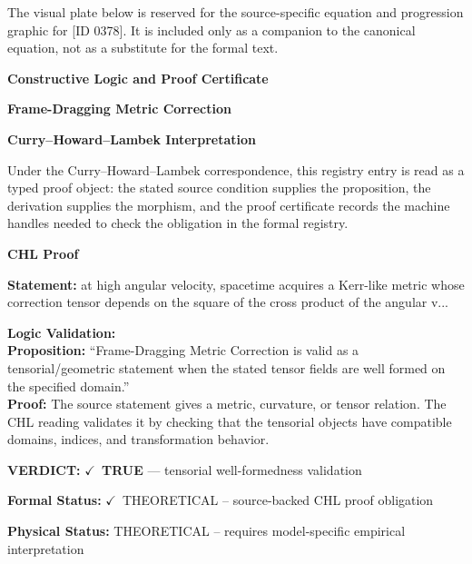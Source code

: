 \begingroup\footnotesize\sloppy
The visual plate below is reserved for the source-specific equation and progression graphic for [ID 0378]. It is included only as a companion to the canonical equation, not as a substitute for the formal text.
\par\endgroup
\ifTZPDarkEdition
{}
\fi

\clearpage
\begingroup\tzpsupportsetup
\noindent\textbf{\fontsize{10.8pt}{12.8pt}\selectfont [ID 0378] Constructive Logic and Proof Certificate}\par
\noindent\textbf{\fontsize{10pt}{12pt}\selectfont Frame-Dragging Metric Correction}\par
\vspace{0.45em}
\begingroup
\footnotesize
\setlength{\parskip}{0.22em}
\setlength{\parindent}{0pt}
\noindent\textbf{Curry--Howard--Lambek Interpretation}\par
Under the Curry--Howard--Lambek correspondence, this registry entry is read as a typed proof
object: the stated source condition supplies the proposition, the derivation supplies the
morphism, and the proof certificate records the machine handles needed to check the obligation
in the formal registry.

\vspace{0.45em}
\noindent\textbf{CHL Proof}\par
\textbf{Statement:} at high angular velocity, spacetime acquires a Kerr-like metric whose correction tensor
depends on the square of the cross product of the angular v...

\textbf{Logic Validation:}\\
\textbf{Proposition:} ``Frame-Dragging Metric Correction is valid as a tensorial/geometric statement when the
stated tensor fields are well formed on the specified domain.''\\
\textbf{Proof:} The source statement gives a metric, curvature, or tensor relation. The CHL reading
validates it by checking that the tensorial objects have compatible domains, indices,
and transformation behavior.

\textbf{VERDICT:} \ensuremath{\checkmark}\ \textbf{TRUE} --- tensorial well-formedness validation

\textbf{Formal Status:} \ensuremath{\checkmark}\ THEORETICAL -- source-backed CHL proof obligation

\textbf{Physical Status:} THEORETICAL -- requires model-specific empirical interpretation
\par\vspace{0.45em}
\par
\ifTZPDarkEdition
{}
\fi
\endgroup
\endgroup
